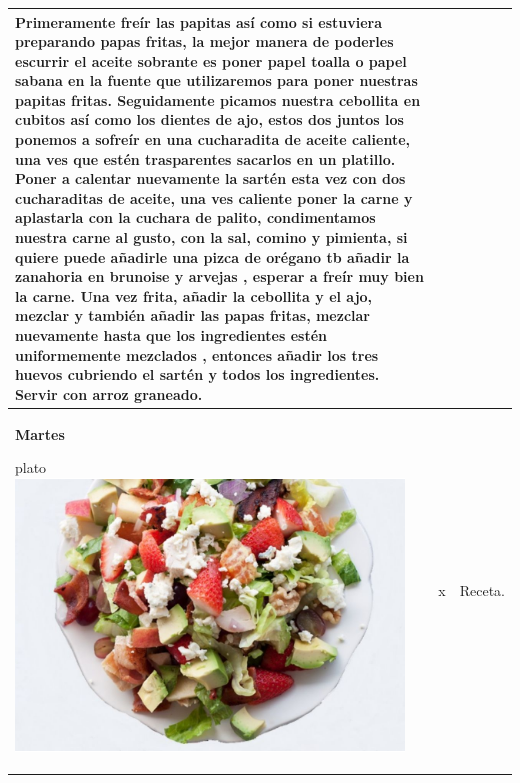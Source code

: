 \documentclass[menu.tex]{subfiles}
\begin{document}
\begin{tabular} {p{3.5cm} p{4cm} p{9cm}}
    \vspace{-1.8cm}
    Primeramente freír las papitas así como si estuviera preparando papas fritas, la mejor manera de poderles escurrir el aceite sobrante es poner papel toalla o papel sabana en la fuente que utilizaremos para poner nuestras papitas fritas. Seguidamente picamos nuestra cebollita en cubitos así como los dientes de ajo, estos dos juntos los ponemos a sofreír en una cucharadita de aceite caliente, una ves que estén trasparentes sacarlos en un platillo. Poner a calentar nuevamente la sartén esta vez con dos cucharaditas de aceite, una ves caliente poner la carne y aplastarla con la cuchara de palito, condimentamos nuestra carne al gusto, con la sal, comino y pimienta, si quiere puede añadirle una pizca de orégano tb añadir la zanahoria en brunoise y arvejas , esperar a freír muy bien la carne. Una vez frita, añadir la cebollita y el ajo, mezclar y también añadir las papas fritas, mezclar nuevamente hasta que los ingredientes estén uniformemente mezclados , entonces añadir los tres huevos cubriendo el sartén y todos los ingredientes. Servir con arroz graneado.\\
    \hline

    \pbox{20cm}
    {
        \rule{0pt}{3ex}\begin{large}\textbf{Martes}\end{large}\\ 
        \rule{0pt}{2ex}plato\\
        \includegraphics[scale=0.30]{ensalada-vegetal-con-carne} 
    } & 
    \vspace{-1.75cm}            
    \begin{compactitem} 
        \begin{scriptsize}
            \item x
        \end{scriptsize}
    \end{compactitem}&
    \vspace{-1.7cm}
    Receta.\\
    \hline


\end{tabular}
\end{document}
